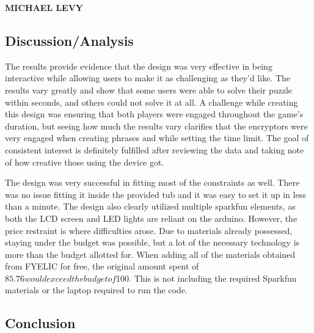 \documentclass[conference]{IEEEtran}
\begin{document}
\newpage


\vspace{10pt} \LARGE \textbf{MICHAEL LEVY} \normalsize

\subsection{Discussion/Analysis}

\par The results provide evidence that the design was very effective in being interactive while allowing users to make it as challenging as they’d like. The results vary greatly and show that some users were able to solve their puzzle within seconds, and others could not solve it at all. A challenge while creating this design was ensuring that both players were engaged throughout the game’s duration, but seeing how much the results vary clarifies that the encryptors were very engaged when creating phrases and while setting the time limit. The goal of consistent interest is definitely fulfilled after reviewing the data and taking note of how creative those using the device got. 
\par The design was very successful in fitting most of the constraints as well. There was no issue fitting it inside the provided tub and it was easy to set it up in less than a minute. The design also clearly utilized multiple sparkfun elements, as both the LCD screen and LED lights are reliant on the arduino. However, the price restraint is where difficulties arose. Due to materials already possessed, staying under the budget was possible, but a lot of the necessary technology is more than the budget allotted for. When adding all of the materials obtained from FYELIC for free, the original amount spent of $85.76 would exceed the budget of $100. This is not including the required Sparkfun materials or the laptop required to run the code. 

\subsection{Conclusion}
\end{document}
